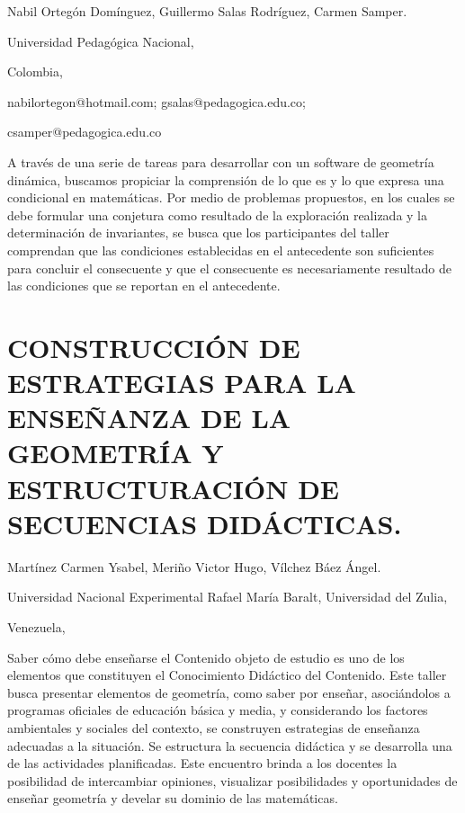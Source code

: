\begin{datos}

Nabil Ortegón Domínguez, Guillermo Salas Rodríguez, Carmen Samper.

Universidad Pedagógica Nacional,

Colombia,

nabilortegon@hotmail.com; gsalas@pedagogica.edu.co;

csamper@pedagogica.edu.co

\end{datos}

A través de una serie de tareas para desarrollar con un software de
geometría dinámica, buscamos propiciar la comprensión de lo que es
y lo que expresa una condicional en matemáticas. Por medio de problemas
propuestos, en los cuales se debe formular una conjetura como resultado
de la exploración realizada y la determinación de invariantes, se
busca que los participantes del taller comprendan que las condiciones
establecidas en el antecedente son suficientes para concluir el consecuente
y que el consecuente es necesariamente resultado de las condiciones
que se reportan en el antecedente.

\setcounter{section}{46}


\section{CONSTRUCCIÓN DE ESTRATEGIAS PARA LA ENSEÑANZA DE LA GEOMETRÍA Y ESTRUCTURACIÓN
DE SECUENCIAS DIDÁCTICAS.}

\begin{datos}

Martínez Carmen Ysabel, Meriño Victor Hugo, Vílchez Báez Ángel.

Universidad Nacional Experimental Rafael María Baralt, Universidad
del Zulia,

Venezuela,

\end{datos}

Saber cómo debe enseñarse el Contenido objeto de estudio es uno de
los elementos que constituyen el Conocimiento Didáctico del Contenido.
Este taller busca presentar elementos de geometría, como saber por
enseñar, asociándolos a programas oficiales de educación básica y
media, y considerando los factores ambientales y sociales del contexto,
se construyen estrategias de enseñanza adecuadas a la situación. Se
estructura la secuencia didáctica y se desarrolla una de las actividades
planificadas. Este encuentro brinda a los docentes la posibilidad
de intercambiar opiniones, visualizar posibilidades y oportunidades
de enseñar geometría y develar su dominio de las matemáticas. 


